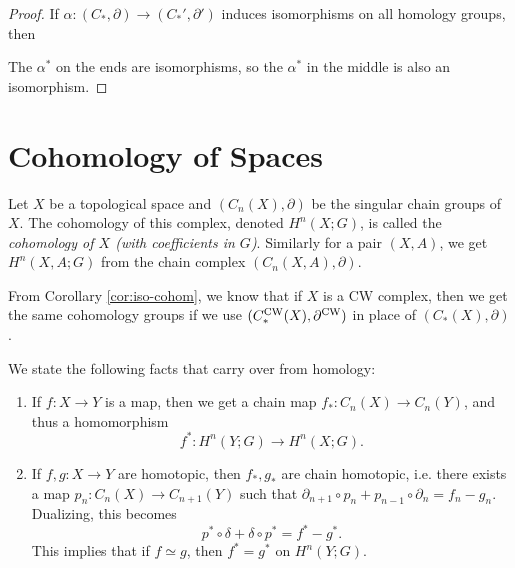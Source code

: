 \begin{proof}
  If $\alpha : (C_*, \partial) \to (C_*', \partial')$
  induces isomorphisms on all homology groups,
  then
  \begin{center}
  \end{center}
  The $\alpha^*$ on the ends are isomorphisms, so
  the $\alpha^*$ in the middle is also an
  isomorphism.
\end{proof}

\section{Cohomology of Spaces}

\begin{definition}
  Let $X$ be a topological space and
  $(C_n(X), \partial)$ be the singular chain groups
  of $X$. The cohomology of this complex, denoted
  $H^n(X; G)$, is
  called the \emph{cohomology of $X$ (with coefficients in $G$)}.
  Similarly for a pair $(X, A)$, we get $H^n(X, A; G)$
  from the chain complex $(C_n(X, A), \partial)$.
\end{definition}

\begin{remark}
  From Corollary \ref{cor:iso-cohom}, we know that
  if $X$ is a CW complex, then we get the same
  cohomology groups if we use
  $(C_*^{\mathrm{CW}}(X), \partial^{\mathrm{CW}})$ in place of
  $(C_*(X), \partial)$.
\end{remark}

\begin{remark}
  We state the following facts that carry over from
  homology:
  \begin{enumerate}
    \item If $f : X \to Y$ is a map, then
      we get a chain map $f_* : C_n(X) \to C_n(Y)$,
      and thus a homomorphism
      \[
        f^* : H^n(Y; G) \to H^n(X; G).
      \]
    \item If $f, g : X \to Y$ are homotopic, then
      $f_*, g_*$ are chain homotopic, i.e. there
      exists a map $p_n : C_n(X) \to C_{n + 1}(Y)$
      such that $\partial_{n + 1} \circ p_n + p_{n - 1} \circ \partial_n = f_n - g_n$.
      Dualizing, this becomes
      \[p^* \circ \delta + \delta \circ p^* = f^* - g^*.\]
      This implies that if $f \simeq g$, then
      $f^* = g^*$ on $H^n(Y; G)$.
  \end{enumerate}
\end{remark}
